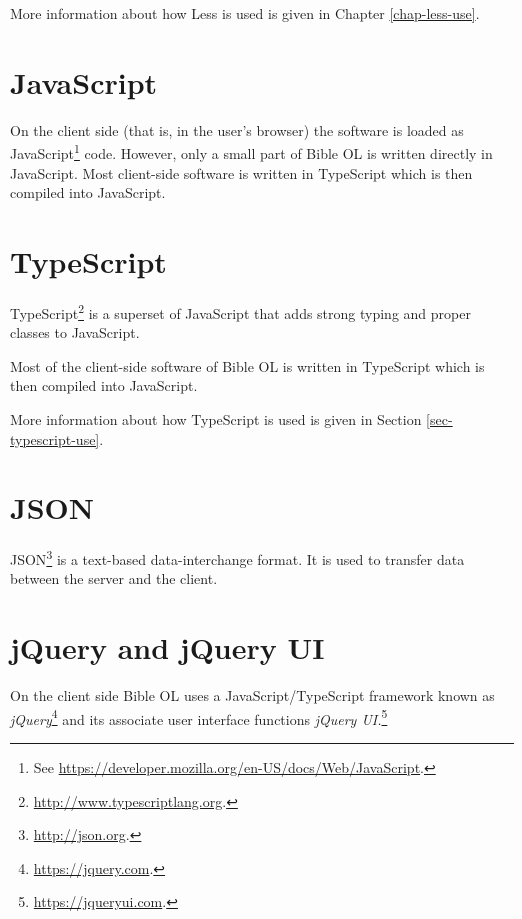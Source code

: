 \documentclass[11pt,oneside,a4paper]{memoir}
\begin{document}
More information about how Less is used is given in Chapter \ref{chap-less-use}.

\section{JavaScript}

On the client side (that is, in the user's browser) the software is loaded as
JavaScript\footnote{See \url{https://developer.mozilla.org/en-US/docs/Web/JavaScript}.} code.
However, only a small part of Bible OL is written directly in JavaScript. Most client-side software
is written in TypeScript which is then compiled into JavaScript.

\section{TypeScript}\label{sec-typescript}

TypeScript\footnote{\url{http://www.typescriptlang.org}.} is a superset of JavaScript that adds
strong typing and proper classes to JavaScript.

Most of the client-side software of Bible OL is written in TypeScript which is then compiled into
JavaScript.

More information about how TypeScript is used is given in Section
\ref{sec-typescript-use}.

\section{JSON}

JSON\footnote{\url{http://json.org}.} is a text-based data-interchange format. It is used to
transfer data between the server and the client.

\section{jQuery and jQuery UI}

On the client side Bible OL uses a JavaScript/TypeScript framework known as
\emph{jQuery}\footnote{\url{https://jquery.com}.} and its associate user interface functions
\emph{jQuery UI.}\footnote{\url{https://jqueryui.com}.}
\end{document}
